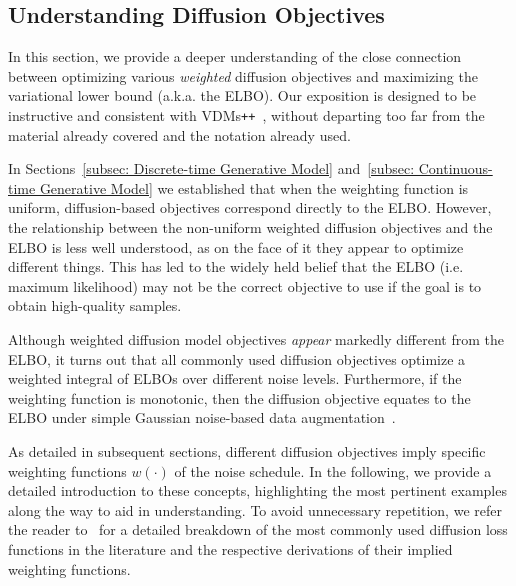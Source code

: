 \newpage
\subsection{Understanding Diffusion Objectives}
\label{subsec: Understanding Diffusion Objectives}
%
In this section, we provide a deeper understanding of the close connection between optimizing various \textit{weighted} diffusion objectives and maximizing the variational lower bound (a.k.a. the ELBO). Our exposition is designed to be instructive and consistent with VDMs\texttt{++}~\citep{kingma2023understanding}, without departing too far from the material already covered and the notation already used.

In Sections~\ref{subsec: Discrete-time Generative Model} and~\ref{subsec: Continuous-time Generative Model} we established that when the weighting function is uniform, diffusion-based objectives correspond directly to the ELBO. However, the relationship between the non-uniform weighted diffusion objectives and the ELBO is less well understood, as on the face of it they appear to optimize different things. This has led to the widely held belief that the ELBO (i.e. maximum likelihood) may not be the correct objective to use if the goal is to obtain high-quality samples.

Although weighted diffusion model objectives \textit{appear} markedly different from the ELBO, it turns out that all commonly used diffusion objectives optimize a weighted integral of ELBOs over different noise levels. Furthermore, if the weighting function is monotonic, then the diffusion objective equates to the ELBO under simple Gaussian noise-based data augmentation~\citep{kingma2023understanding}.

As detailed in subsequent sections, different diffusion objectives imply specific weighting functions $w(\cdot)$ of the noise schedule. In the following, we provide a detailed introduction to these concepts, highlighting the most pertinent examples along the way to aid in understanding. To avoid unnecessary repetition, we refer the reader to~\cite{kingma2023understanding} for a detailed breakdown of the most commonly used diffusion loss functions in the literature and the respective derivations of their implied weighting functions.
%
